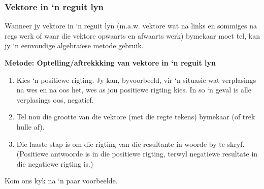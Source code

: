 \subsubsection*{Vektore in ‘n reguit lyn}

Wanneer jy vektore in ‘n reguit lyn (m.a.w. vektore wat na links en sommiges na regs werk of waar die vektore opwaarts en afwaarts werk) bymekaar moet tel, kan jy ‘n eenvoudige algebraïese metode gebruik.\\

\begin{minipage}{\textwidth}
\textbf{Metode: Optelling/aftrekkking van vektore in ‘n reguit lyn}
\begin{enumerate}[noitemsep, label=\textbf{\arabic*}.]
\item{Kies ‘n positiewe rigting. Jy kan, byvoorbeeld, vir ‘n situasie wat verplasings na wes en na oos het, wes as jou positiewe rigting kies. In so ‘n geval is alle verplasings oos, negatief.}
\item{Tel nou die grootte van die vektore (met die regte tekens) bymekaar (of trek hulle af).}
\item{Die laaste stap is om die rigting van die resultante in woorde by te skryf. (Positiewe antwoorde is in die positiewe rigting, terwyl negatiewe resultate in die negatiewe rigting is.)}\\
\end{enumerate}
\end{minipage}

Kom ons kyk na ‘n paar voorbeelde.

